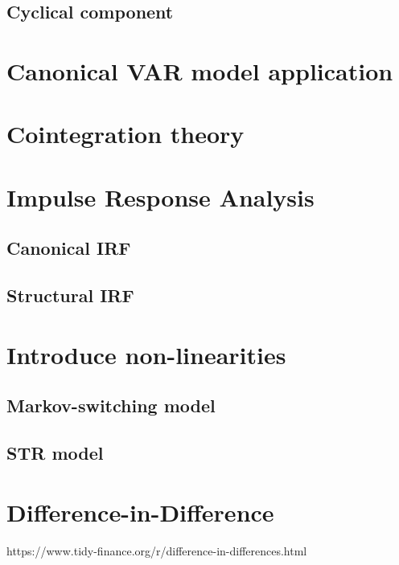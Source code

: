 \documentclass[hidelinks,12pts]{article}
\DeclareMathOperator{\1}{\mathbbm{1}}
\begin{document}
    \subsection{Cyclical component}






\section{Canonical VAR model application}\label{sec:var}




\section{Cointegration theory}\label{sec:cointegration}




\section{Impulse Response Analysis}\label{sec:irf}
    \subsection{Canonical IRF}\label{sec:canonical_irf}


    \subsection{Structural IRF}\label{sec:structural_irf}



\section{Introduce non-linearities}\label{sec:nonlinearities}
    \subsection{Markov-switching model}\label{sec:markov}

    
    \subsection{STR model}\label{sec:str}



\section{Difference-in-Difference}
https://www.tidy-finance.org/r/difference-in-differences.html
    
\end{document}
